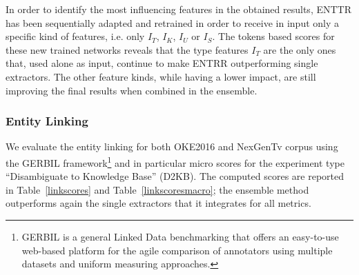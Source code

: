 \documentclass{llncs}
\newcommand{\tabref}[1]{\mbox{Table~\ref{#1}}}
\begin{document}
In order to identify the most influencing features in the obtained results, ENTTR has been sequentially adapted and retrained in order to receive in input only a specific kind of features, i.e. only $I_T$, $I_K$, $I_U$ or $I_S$. The tokens based scores for these new trained networks reveals that the type features \textit{$I_T$} are the only ones that, used alone as input, continue to make ENTRR outperforming single extractors. The other feature kinds, while having a lower impact, are still improving the final results when combined in the ensemble.

\subsubsection{Entity Linking}

We evaluate the entity linking for both OKE2016 and NexGenTv corpus using the GERBIL framework\footnote{GERBIL is a general Linked Data benchmarking that offers an easy-to-use web-based platform for the agile comparison of annotators using multiple datasets and uniform measuring approaches.} and in particular micro scores for the experiment type ``Disambiguate to Knowledge Base'' (D2KB). The computed scores are reported in \tabref{linkscores} and \tabref{linkscoresmacro}; the ensemble method outperforms again the single extractors that it integrates for all metrics.
\end{document}
